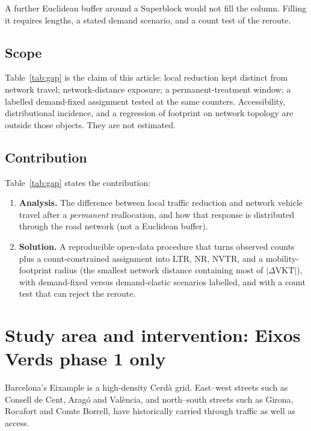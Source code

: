 \documentclass[a4paper,fleqn]{cas-dc}
\newcommand{\DVKT}{\Delta\mathrm{VKT}}
\begin{document}
A further Euclidean buffer around a Superblock would not fill the column.
Filling it requires lengths, a stated demand scenario, and a count test of
the reroute.

\subsection{Scope}

Table~\ref{tab:gap} is the claim of this article: local reduction kept
distinct from network travel; network-distance exposure; a permanent-treatment
window; a labelled demand-fixed assignment tested at the same counters.
Accessibility, distributional incidence, and a regression of footprint on
network topology are outside those objects. They are not estimated.

\subsection{Contribution}

Table~\ref{tab:gap} states the contribution:
\begin{enumerate}
\item \textbf{Analysis.} The difference between local traffic reduction and
network vehicle travel after a \emph{permanent} reallocation, and how that
response is distributed through the road network (not a Euclidean buffer).
\item \textbf{Solution.} A reproducible open-data procedure that turns
observed counts plus a count-constrained assignment into LTR, NR, NVTR, and a
mobility-footprint radius (the smallest network distance containing most of
$|\DVKT|$), with demand-fixed versus demand-elastic scenarios labelled, and
with a count test that can reject the reroute.
\end{enumerate}

\section{Study area and intervention: Eixos Verds phase 1 only}
\label{sec:area}

Barcelona's Eixample is a high-density Cerd\`a grid. East--west streets such
as Consell de Cent, Arag\'o and Val\`encia, and north--south streets such as
Girona, Rocafort and Comte Borrell, have historically carried through traffic
as well as access.
\end{document}
